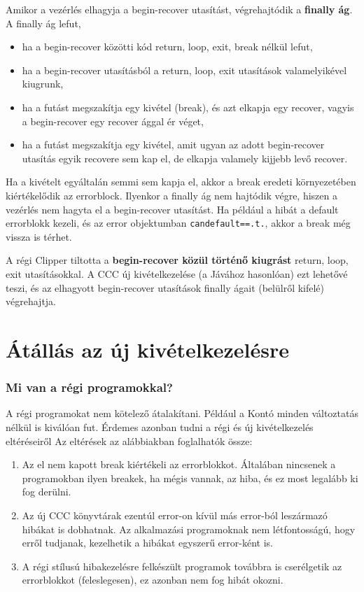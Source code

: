 Amikor a vezérlés elhagyja a begin-recover utasítást, 
végrehajtódik  a {\bf finally ág\/}. A finally ág lefut,
\begin{itemize}
\item ha a begin-recover közötti kód  return, loop, exit, break nélkül lefut,
\item ha a begin-recover utasításból a return, loop, exit
      utasítások valamelyikével kiugrunk,
\item ha a futást megszakítja egy kivétel (break),
      és azt elkapja egy recover,
      vagyis a begin-recover egy recover ággal ér véget,
\item ha a futást megszakítja egy kivétel,
      amit  ugyan az adott begin-recover utasítás egyik recovere
      sem kap el, de elkapja valamely kijjebb levő recover.
\end{itemize}

Ha a kivételt egyáltalán semmi sem kapja el, 
akkor a break eredeti környezetében kiértékelődik az  errorblock.
Ilyenkor a finally ág nem hajtódik végre, hiszen a vezérlés nem hagyta
el a begin-recover utasítást. Ha például a hibát a default errorblokk
kezeli, és az error objektumban \verb!candefault==.t.!, akkor
a break még vissza is térhet.

A régi Clipper tiltotta a 
{\bf begin-recover közül történő kiugrást} 
return, loop, exit utasításokkal.
A CCC új kivételkezelése (a Jávához hasonlóan) ezt lehetővé teszi,
és az elhagyott begin-recover utasítások finally ágait
(belülről kifelé) végrehajtja.


\section{Átállás az új kivételkezelésre}


\subsubsection{Mi van a régi programokkal?}

A régi programokat nem kötelező átalakítani. 
Például a Kontó minden változtatás nélkül is kiválóan fut.
Érdemes azonban tudni a régi és új kivételkezelés eltéréseiről
Az eltérések az alábbiakban foglalhatók össze:

\begin{enumerate}
\item Az el nem kapott break kiértékeli az errorblokkot.
Általában nincsenek a programokban ilyen breakek,
ha mégis vannak, az hiba, és ez most legalább ki fog derülni.

\item Az új CCC könyvtárak ezentúl error-on kívül más
error-ból leszármazó hibákat is dobhatnak. 
Az alkalmazási programoknak nem létfontosságú, 
hogy erről tudjanak, kezelhetik a hibákat egyszerű
error-ként is.

\item A régi stílusú hibakezelésre felkészült programok
továbbra is cserélgetik az errorblokkot (feleslegesen),
ez azonban nem fog hibát okozni.
\end{enumerate}

